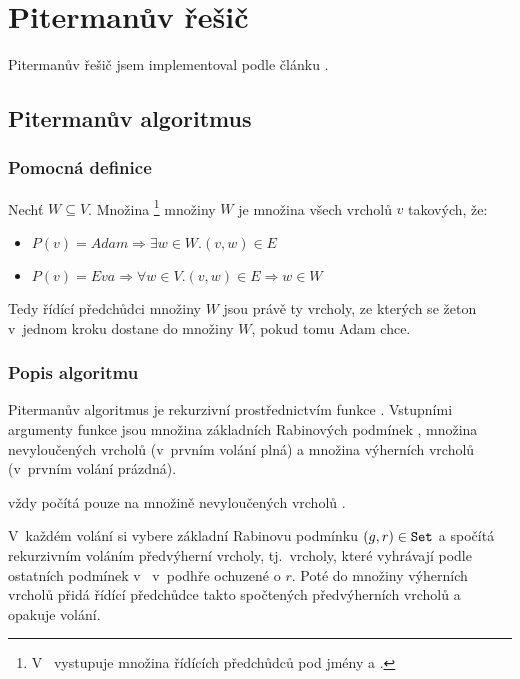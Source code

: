 \chapter{Pitermanův řešič} \label{chap:piterman}
Pitermanův řešič jsem implementoval podle článku \cite{Piterman2006}.
\section{Pitermanův algoritmus}
\subsection{Pomocná definice}
\begin{definition}
\label{def:cpred}
Nechť $W \subseteq V$. Množina \footnote{V~\cite{Piterman2006} vystupuje množina řídících předchůdců pod jmény  a .} množiny $W$ je množina všech vrcholů $v$ takových, že:
\begin{itemize}
\item $P(v) = Adam \Rightarrow \exists w \in W. (v, w) \in E$
\item $P(v) = Eva \Rightarrow \forall w \in V. (v, w) \in E \Rightarrow w \in W$
\end{itemize}
\end{definition}
\begin{informal}
Tedy řídící předchůdci množiny $W$ jsou právě ty vrcholy, ze kterých se žeton v~jednom kroku dostane do množiny $W$, pokud tomu Adam chce.
\end{informal}
\subsection{Popis algoritmu}
Pitermanův algoritmus je rekurzivní prostřednictvím funkce . Vstupními argumenty funkce  jsou množina základních Rabinových podmínek , množina nevyloučených vrcholů  (v~prvním volání plná) a množina výherních vrcholů  (v~prvním volání prázdná).

 vždy počítá pouze na množině nevyloučených vrcholů .

V~každém volání si  vybere základní Rabinovu podmínku $(g, r) \in \texttt{Set}$ a spočítá rekurzivním voláním  předvýherní vrcholy, tj.~vrcholy, které vyhrávají podle ostatních podmínek v~ v~podhře ochuzené o $r$. Poté do množiny výherních vrcholů  přidá řídící předchůdce takto spočtených předvýherních vrcholů a opakuje volání.


